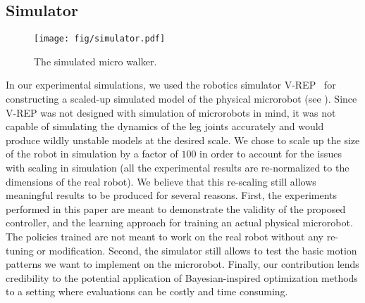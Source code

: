\subsection{Simulator}
	\begin{wrapfigure}{r}{0.46\linewidth} 
	  \centering
	  \vspace{-10pt}
	  \texttt{[image: fig/simulator.pdf]}
	  \caption{The simulated micro walker.}
	  \label{fig:vrep}
	  \vspace{-8pt}
	\end{wrapfigure}
	In our experimental simulations, we used the robotics simulator V-REP~\citep{vrep} for constructing a scaled-up simulated model of the physical microrobot (see ).
	Since V-REP was not designed with simulation of microrobots in mind, it was not capable of simulating the dynamics of the leg joints accurately and would produce wildly unstable models at the desired scale.
	We chose to scale up the size of the robot in simulation by a factor of $100$ in order to account for the issues with scaling in simulation (all the experimental results are re-normalized to the dimensions of the real robot).
	We believe that this re-scaling still allows meaningful results to be produced for several reasons.
	First, the experiments performed in this paper are meant to demonstrate the validity of the proposed controller, and the learning approach for training an actual physical microrobot.
	The policies trained are not meant to work on the real robot without any re-tuning or modification.
	Second, the simulator still allows to test the basic motion patterns we want to implement on the microrobot.
	Finally, our contribution lends credibility to the potential application of Bayesian-inspired optimization methods to a setting where evaluations can be costly and time consuming.
